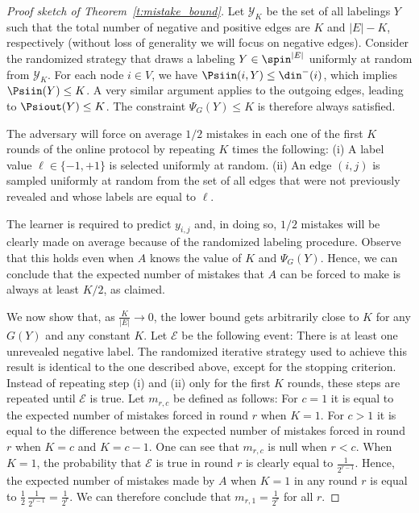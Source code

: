 \begin{proof}[Proof sketch of Theorem~\ref{t:mistake_bound}]
Let $\mathcal{Y}_K$ be the set of all labelings $Y$ such that the total number of negative and positive edges are $K$ and $|E|-K$, respectively (without loss of generality we will focus on negative edges). Consider the randomized strategy that draws a labeling 
$Y \in \spin^{|E|}$
uniformly at random from $\mathcal{Y}_K$. For each node $i \in V$, we have $\Psiin(i,Y) \le \din^-(i)$, which implies $\Psiin(Y) \le K$. A very similar argument applies to the outgoing edges, leading to $\Psiout(Y) \le K$. The constraint $\Psi_G(Y) \le K$ is therefore always satisfied.

The adversary will force on average $1/2$ mistakes in each one of the first $K$ rounds of the online protocol by repeating $K$ times the following: (i) A label value $\ell\in\{-1,+1\}$ is selected uniformly at random. (ii) An edge $(i,j)$ is sampled uniformly at random from the set of all edges that were not previously revealed and whose labels are equal to $\ell$. 

The learner is required to predict $y_{i,j}$ and, in doing so, $1/2$ mistakes will be clearly made on average because of the randomized labeling procedure. Observe that this holds even when $A$ knows the value of $K$ and $\Psi_G(Y)$. Hence, we can conclude that the expected number of mistakes that $A$ can be forced to make is always at least $K/2$, as claimed.


We now show that, as $\frac{K}{|E|} \rightarrow 0$, the lower bound gets arbitrarily close to $K$ for any $G(Y)$ and any constant $K$.
%
Let $\mathcal{E}$ be the following event: There is at least one unrevealed negative label.
The randomized iterative strategy used to achieve this result is identical to the one described above, except for the stopping criterion. Instead of repeating step (i) and (ii) only for the first $K$ rounds, these steps are repeated until $\mathcal{E}$ is true.
%
Let $m_{r,c}$ be defined as follows: For $c=1$ it is equal to the expected number of mistakes forced in round $r$ when $K=1$. For $c > 1$ it is equal to the difference between the expected number of mistakes forced in round $r$ when $K=c$ and $K=c-1$. One can see that $m_{r,c}$ is 
null when $r<c$. 
%
When $K=1$, the probability that $\mathcal{E}$ is true in round $r$ is clearly equal to $\frac{1}{2^{r-1}}$.
Hence, the expected number of mistakes made by $A$ when $K=1$ in any round $r$ is equal to 
\(
\frac{1}{2}\,\frac{1}{2^{r-1}} = \frac{1}{2^{r}}.
\)
We can therefore conclude that $m_{r,1}=\frac{1}{2^{r}}$ for all $r$.


\end{proof}
